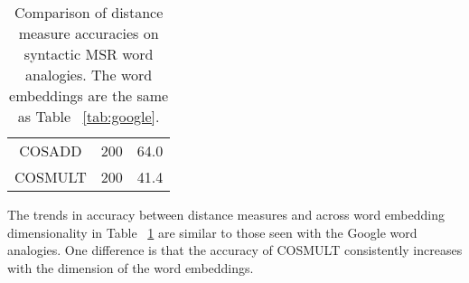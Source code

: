 \documentclass{article}
\newcommand*{\0}{\Vec{0}}
\begin{document}
\begin{description}
\begin{table}[H]
\begin{tabular}{|cc|r|}
				\hline
				COSADD & 200 & 64.0 \\
				COSMULT & 200 & 41.4 \\
				\hline
			\end{tabular}
			\caption{Comparison of distance measure accuracies on syntactic MSR word analogies. The word embeddings are the same as Table ~\ref{tab:google}.}
			\label{tab:msr}
		\end{table}
		The trends in accuracy between distance measures and across word embedding dimensionality in Table ~\ref{tab:msr} are similar to those seen with the Google word analogies.
		One difference is that the accuracy of COSMULT consistently increases with the dimension of the word embeddings.
\end{description}



\end{document}

